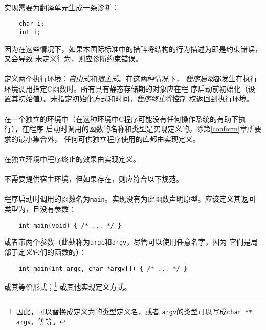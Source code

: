 \paragraph{}
\ex* 实现需要为翻译单元生成一条诊断：
\begin{lstlisting}
    char i;
    int i;
\end{lstlisting}
因为在这些情况下，如果本国际标准中的措辞将结构的行为描述为即是约束错误，又会导致
未定义行为，则应诊断约束错误。

\paragraph{}
定义两个执行环境：\textit{自由式}和\textit{宿主式}。在这两种情况下，
\textit{程序启动}都发生在执行环境调用指定C函数时。所有具有静态存储期的对象应在程
序启动前初始化（设置其初始值）。未指定初始化方式和时间。\textit{程序终止}将控制
权返回到执行环境。


\paragraph{}
在一个独立的环境中（在这种环境中C程序可能没有任何操作系统的有助下执行），在程序
启动时调用的函数的名称和类型是实现定义的。除第\ref{conform}章所要求的最小集合外，
任何可供独立程序使用的库都由实现定义。

\paragraph{}
在独立环境中程序终止的效果由实现定义。

\paragraph{}
不需要提供宿主环境，但如果存在，则应符合以下规范。

\paragraph{}
程序启动时调用的函数名为\texttt{main}。实现没有为此函数声明原型。应该定义其返回
类型为，且没有参数：
\begin{lstlisting}
    int main(void) { /* ... */ }
\end{lstlisting}
或者带两个参数（此处称为\texttt{argc}和\texttt{argv}，尽管可以使用任意名字，因为
它们是局部于定义它们的函数的）：
\begin{lstlisting}
    int main(int argc, char *argv[]) { /* ... */ }
\end{lstlisting}
或其等价形式；\footnote{因此，可以替换成定义为的类型定义名，或者
\texttt{argv}的类型可以写成\texttt{char ** argv}，等等。} 或其他实现定义方式。

